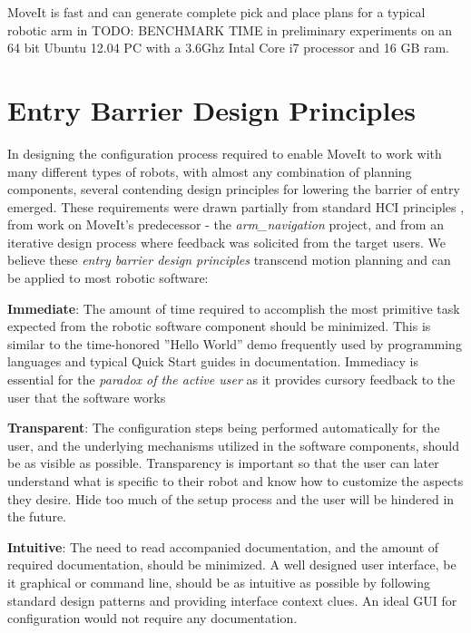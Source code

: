 \documentclass[10pt,journal,compsoc]{joser1}
\begin{document}
{MoveIt is fast and can generate complete pick and place plans for a typical robotic arm in TODO: BENCHMARK TIME in preliminary experiments on an 64 bit Ubuntu 12.04 PC with a 3.6Ghz Intal Core i7 processor and 16 GB ram.

\section{Entry Barrier Design Principles}
\label{sec::requirements}

In designing the configuration process required to enable MoveIt to work with many different types of robots, with almost any combination of planning components, several contending design principles for lowering the barrier of entry emerged. These requirements were drawn partially from standard HCI principles \cite{galitz2007essential}, from work on MoveIt's predecessor - the \textit{arm\_navigation} project, and from an iterative design process where feedback was solicited from the target users. We believe these \textit{entry barrier design principles} transcend motion planning and can be applied to most robotic software:

{\bf Immediate}: The amount of time required to accomplish the most primitive task expected from the robotic software component should be minimized. This is similar to the time-honored ''Hello World'' demo frequently used by programming languages and typical Quick Start guides in documentation. Immediacy is essential for the \textit{paradox of the active user} as it provides cursory feedback to the user that the software works

{\bf Transparent}: The configuration steps being performed automatically for the user, and the underlying mechanisms utilized in the software components, should be as visible as possible. Transparency is important so that the user can later understand what is specific to their robot and know how to customize the aspects they desire. Hide too much of the setup process and the user will be hindered in the future.

{\bf Intuitive}: The need to read accompanied documentation, and the amount of required documentation, should be minimized. A well designed user interface, be it graphical or command line, should be as intuitive as possible by following standard design patterns and providing interface context clues. An ideal GUI for configuration would not require any documentation.

}
\end{document}
